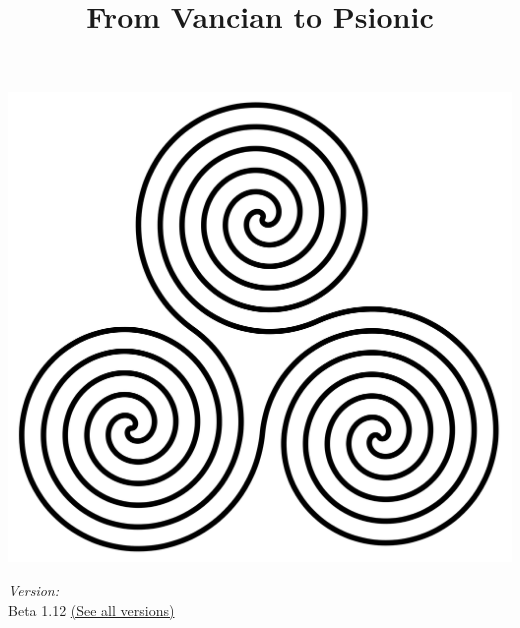 \documentclass[a4paper,10pt]{article}
\title{From Vancian to Psionic}
\date{}
\author{}
\begin{document}
\begin{titlepage}
\maketitle
\thispagestyle{empty}
\includegraphics[width=\textwidth]{Pics/TripleSpiral.png}
\vfill
\begin{flushright} \large
\emph{Version:} \\
Beta 1.12 \href{https://github.com/Ernir/VancianToPsionics/releases}{(See all versions)}\\
\end{flushright}
\end{titlepage}
\end{document}
